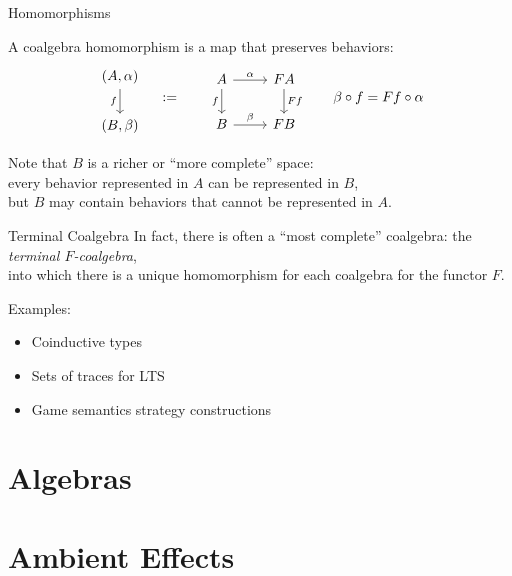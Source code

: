 \documentclass[aspectratio=1610,mathserif]{beamer}
\begin{document}
\begin{frame}[fragile]{Homomorphisms} %
  \begin{definition}
  A coalgebra homomorphism is a map that preserves behaviors:
  \[
    \begin{tikzcd}
       (A, \alpha) \ar[d, "f"'] \\ (B, \beta)
    \end{tikzcd}
    \quad := \qquad
    \begin{tikzcd}
       A \ar[r, "\alpha"] \ar[d, "f"'] &
       FA \ar[d, "Ff"] \\
       B \ar[r, "\beta"] &
       FB
    \end{tikzcd}
    \qquad
    \beta \circ f = F f \circ \alpha
  \]
  \end{definition}

  \pause
  \vspace{1em}
  Note that $B$ is a richer or ``more complete'' space: \\
  every behavior represented in $A$ can be represented in $B$, \\
  but $B$ may contain behaviors that cannot be represented in $A$.
\end{frame}

\begin{frame}{Terminal Coalgebra} %
  In fact, there is often a ``most complete'' coalgebra:
  the \emph{terminal $F$-coalgebra}, \\
  into which there is a unique homomorphism
  for each coalgebra for the functor $F$.

  \pause
  \vspace{1em}
  Examples:
  \begin{itemize}
    \item Coinductive types
    \item Sets of traces for LTS
    \item Game semantics strategy constructions
  \end{itemize}
\end{frame}


\section{Algebras}
\frame\sectionpage

\section{Ambient Effects}
\frame\sectionpage
\end{document}
